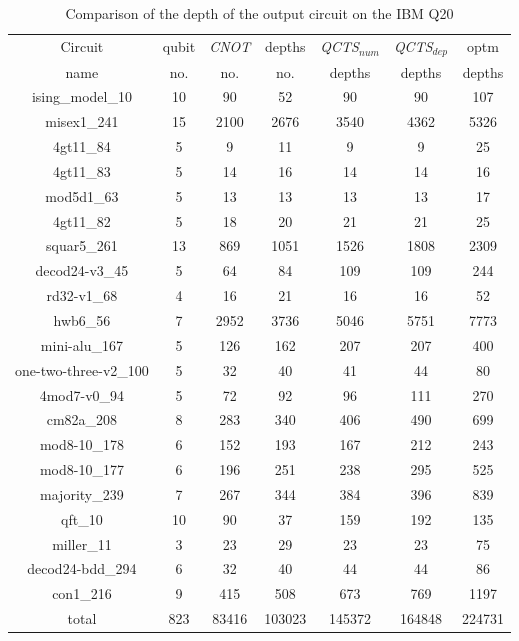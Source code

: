 \documentclass[runningheads]{llncs}
\begin{document}
							\begin{table}[H]
								\label{tab8}
								\begin{center}  
								\begin{tabular}{|c|c|c|c|c|c|c|}
								\hline
								Circuit &  qubit  & \textit{CNOT} &depths &\textit{QCTS$_{num}$}& \textit{QCTS$_{dep}$}  & optm 	  	\\
								 name	&   no. 	&	no. & no. & depths&  depths &  depths 	\\
								\hline
								ising\_model\_10 & 10 & 90 & 52 & 90 & 90 & 107 \\
								misex1\_241 & 15 & 2100 & 2676 & 3540 & 4362 & 5326 \\
								4gt11\_84 & 5 & 9 & 11 & 9 & 9 & 25 \\
								4gt11\_83 & 5 & 14 & 16 & 14 & 14 & 16 \\
								mod5d1\_63 & 5 & 13 & 13 & 13 & 13 & 17 \\
								4gt11\_82 & 5 & 18 & 20 & 21 & 21 & 25 \\
								squar5\_261 & 13 & 869 & 1051 & 1526 & 1808 & 2309 \\
								decod24-v3\_45 & 5 & 64 & 84 & 109 & 109 & 244 \\
								rd32-v1\_68 & 4 & 16 & 21 & 16 & 16 & 52 \\
								hwb6\_56 & 7 & 2952 & 3736 & 5046 & 5751 & 7773 \\
								mini-alu\_167 & 5 & 126 & 162 & 207 & 207 & 400 \\
								one-two-three-v2\_100 & 5 & 32 & 40 & 41 & 44 & 80 \\
								4mod7-v0\_94 & 5 & 72 & 92 & 96 & 111 & 270 \\
								cm82a\_208 & 8 & 283 & 340 & 406 & 490 & 699 \\
								mod8-10\_178 & 6 & 152 & 193 & 167 & 212 & 243 \\
								mod8-10\_177 & 6 & 196 & 251 & 238 & 295 & 525 \\
								majority\_239 & 7 & 267 & 344 & 384 & 396 & 839 \\
								qft\_10 & 10 & 90 & 37 & 159 & 192 & 135 \\
								miller\_11 & 3 & 23 & 29 & 23 & 23 & 75 \\
								decod24-bdd\_294 & 6 & 32 & 40 & 44 & 44 & 86 \\
								con1\_216 & 9 & 415 & 508 & 673 & 769 & 1197 \\
								\hline
								total & 823 & 83416 & 103023 & 145372 & 164848 & 224731  \\ 
							\hline
								\end{tabular} 
								\end{center}						
								\caption{Comparison of  the depth of the output circuit on the IBM Q20} 
								\label{tab8}\end{table}
\end{document}
